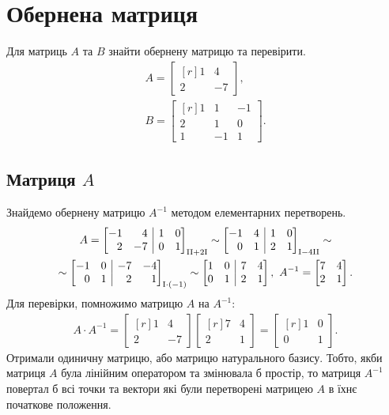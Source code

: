 \section{Обернена матриця}
Для матриць \(A\) та \(B\) знайти обернену матрицю та перевірити.
\begin{gather}
	A=\begin{bmatrix*}[r]
		1&4\\2&-7
	\end{bmatrix*},\\
	B=\begin{bmatrix*}[r]
		1&1&-1\\
		2&1&0\\
		1&-1&1
	\end{bmatrix*}.
\end{gather}
\subsection[Матриця A]{Матриця \(A\)}
\solving
Знайдемо обернену матрицю \(A^{-1}\) методом елементарних перетворень.
\begin{gather}
	A=\left[\begin{array}{@{}rr|rr@{}}
		-1&4&1&0\\
		2&-7&0&1
	\end{array}\right]_{\substack{\mathrm{II+2I}}}\sim\left[\begin{array}{@{}rr|rr@{}}
	-1&4&1&0\\
	0&1&2&1
\end{array}\right]_{\mathrm{I-4II}}\sim\\
\sim\left[\begin{array}{@{}rr|rr@{}}
-1&0&-7&-4\\
0&1&2&1
\end{array}\right]_{\mathrm{I\cdot(-1)}}\sim\left[\begin{array}{@{}rr|rr@{}}
1&0&7&4\\
0&1&2&1
\end{array}\right],\ A^{-1}=\begin{bmatrix*}[r]
7&4\\2&1
\end{bmatrix*}.
\end{gather}
Для перевірки, помножимо матрицю \(A\) на \(A^{-1}\):
\begin{gather}
	A\cdot A^{-1}=\begin{bmatrix*}[r]
		1&4\\2&-7
	\end{bmatrix*}\begin{bmatrix*}[r]
	7&4\\2&1
\end{bmatrix*}=\begin{bmatrix*}[r]
1&0\\0&1
\end{bmatrix*}.
\end{gather}
Отримали одиничну матрицю, або матрицю натурального базису. Тобто, якби матриця \(A\) була лінійним оператором та змінювала б простір, то матриця \(A^{-1}\) повертал б всі точки та вектори які були перетворені матрицею \(A\) в їхнє початкове положення.

